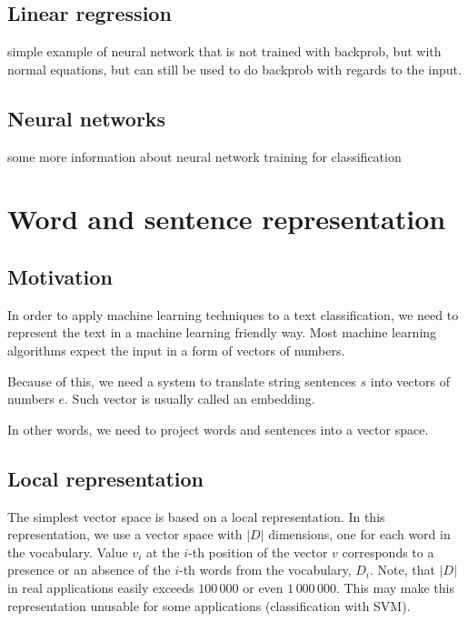         \subsection{Linear regression}
            simple example of neural network that is not trained with backprob, but with normal equations,  
            but can still be used to do backprob with regards to the input.
        \subsection{Neural networks}
            some more information about neural network training for classification

        
    \section{Word and sentence representation}

        \subsection{Motivation}
        In order to apply machine learning techniques to a text classification, 
        we need to represent the text in a machine learning friendly way.
        Most machine learning algorithms expect the input in a form of vectors of numbers. 
        
        Because of this, we need a system to translate string sentences $s$ into vectors of numbers $e$.
        Such vector is usually called an embedding. 
        
        In  other words, we need to project words and sentences into a vector space.
        
        \subsection{Local representation}
        
        The simplest vector space is based on a local representation.
        In this representation, we use a vector space with $|D|$ dimensions, one for each word in the vocabulary.
        Value $v_i$ at the $i$-th position of the vector $v$ corresponds to a presence or an absence of the $i$-th words from the vocabulary, $D_i$.
        Note, that $|D|$ in real applications easily exceeds $100\,000$ or even $1\,000\,000$.
        This may make this representation unusable for some applications (classification with SVM).
        
